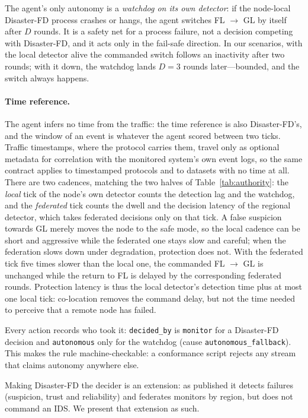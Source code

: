 The agent's only autonomy is a \emph{watchdog on its own detector}: if the node-local
Disaster-FD process crashes or hangs, the agent switches FL $\rightarrow$ GL by itself
after $D$ rounds. It is a safety net for a process failure, not a decision competing with
Disaster-FD, and it acts only in the fail-safe direction. In our scenarios, with the local
detector alive the commanded switch follows an inactivity after two rounds; with it down,
the watchdog lands $D=3$ rounds later---bounded, and the switch always happens.

\paragraph{Time reference.} The agent infers no time from the traffic: the time reference
is also Disaster-FD's, and the window of an event is whatever the agent scored between two
ticks. Traffic timestamps, where the protocol carries them, travel only as optional
metadata for correlation with the monitored system's own event logs, so the same contract
applies to timestamped protocols and to datasets with no time at all. There are two
cadences, matching the two
halves of Table~\ref{tab:authority}: the \emph{local} tick of the node's own detector counts
the detection lag and the watchdog, and the \emph{federated} tick counts the dwell and the
decision latency of the regional detector, which takes federated decisions only on that
tick. A false suspicion towards GL merely moves the node to the safe mode, so the local
cadence can be short and aggressive while the federated one stays slow and careful; when
the federation slows down under degradation, protection does not. With the federated tick
five times slower than the local one, the commanded FL $\rightarrow$ GL is unchanged while
the return to FL is delayed by the corresponding federated rounds. Protection latency is
thus the local detector's detection time plus at most one local tick: co-location removes
the command delay, but not the time needed to perceive that a remote node has failed.

Every action records who took it: \texttt{decided\_by} is \texttt{monitor} for a
Disaster-FD decision and \texttt{autonomous} only for the watchdog (cause
\texttt{autonomous\_fallback}). This makes the rule machine-checkable: a conformance
script rejects any stream that claims autonomy anywhere else.

Making Disaster-FD the decider is an extension: as published it detects failures
(suspicion, trust and reliability) and federates monitors by region, but does not command
an IDS. We present that extension as such.

